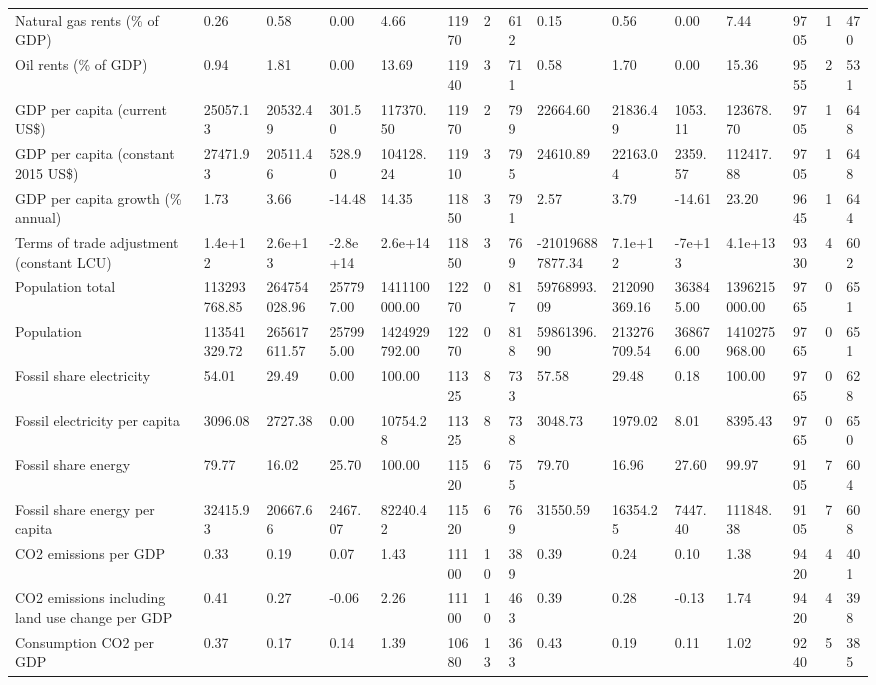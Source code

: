 \begin{longtable}{lllllllllllllll}
Natural gas rents (\% of GDP) & 0.26 & 0.58 & 0.00 & 4.66 & 11970 & 2 & 612 & 0.15 & 0.56 & 0.00 & 7.44 & 9705 & 1 & 470\\
Oil rents (\% of GDP) & 0.94 & 1.81 & 0.00 & 13.69 & 11940 & 3 & 711 & 0.58 & 1.70 & 0.00 & 15.36 & 9555 & 2 & 531\\
GDP per capita (current US\$) & 25057.13 & 20532.49 & 301.50 & 117370.50 & 11970 & 2 & 799 & 22664.60 & 21836.49 & 1053.11 & 123678.70 & 9705 & 1 & 648\\
GDP per capita (constant 2015 US\$) & 27471.93 & 20511.46 & 528.90 & 104128.24 & 11910 & 3 & 795 & 24610.89 & 22163.04 & 2359.57 & 112417.88 & 9705 & 1 & 648\\
\addlinespace
GDP per capita growth (\% annual) & 1.73 & 3.66 & -14.48 & 14.35 & 11850 & 3 & 791 & 2.57 & 3.79 & -14.61 & 23.20 & 9645 & 1 & 644\\
Terms of trade adjustment (constant LCU) & 1.4e+12 & 2.6e+13 & -2.8e+14 & 2.6e+14 & 11850 & 3 & 769 & -210196887877.34 & 7.1e+12 & -7e+13 & 4.1e+13 & 9330 & 4 & 602\\
Population total & 113293768.85 & 264754028.96 & 257797.00 & 1411100000.00 & 12270 & 0 & 817 & 59768993.09 & 212090369.16 & 363845.00 & 1396215000.00 & 9765 & 0 & 651\\
Population & 113541329.72 & 265617611.57 & 257995.00 & 1424929792.00 & 12270 & 0 & 818 & 59861396.90 & 213276709.54 & 368676.00 & 1410275968.00 & 9765 & 0 & 651\\
Fossil share electricity & 54.01 & 29.49 & 0.00 & 100.00 & 11325 & 8 & 733 & 57.58 & 29.48 & 0.18 & 100.00 & 9765 & 0 & 628\\
\addlinespace
Fossil electricity per capita & 3096.08 & 2727.38 & 0.00 & 10754.28 & 11325 & 8 & 738 & 3048.73 & 1979.02 & 8.01 & 8395.43 & 9765 & 0 & 650\\
Fossil share energy & 79.77 & 16.02 & 25.70 & 100.00 & 11520 & 6 & 755 & 79.70 & 16.96 & 27.60 & 99.97 & 9105 & 7 & 604\\
Fossil share energy per capita & 32415.93 & 20667.66 & 2467.07 & 82240.42 & 11520 & 6 & 769 & 31550.59 & 16354.25 & 7447.40 & 111848.38 & 9105 & 7 & 608\\
CO2 emissions per GDP & 0.33 & 0.19 & 0.07 & 1.43 & 11100 & 10 & 389 & 0.39 & 0.24 & 0.10 & 1.38 & 9420 & 4 & 401\\
CO2 emissions including land use change per GDP & 0.41 & 0.27 & -0.06 & 2.26 & 11100 & 10 & 463 & 0.39 & 0.28 & -0.13 & 1.74 & 9420 & 4 & 398\\
\addlinespace
Consumption CO2 per GDP & 0.37 & 0.17 & 0.14 & 1.39 & 10680 & 13 & 363 & 0.43 & 0.19 & 0.11 & 1.02 & 9240 & 5 & 385\\

\end{longtable}

